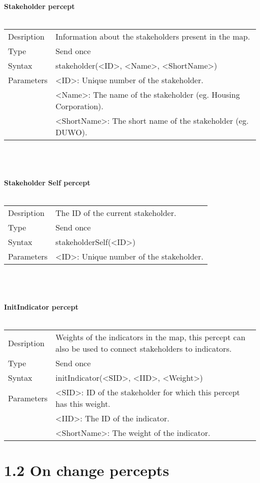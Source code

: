 \documentclass[english,11pt]{report}
\begin{document}
\textbf{Stakeholder percept}\\
\\
\begin{tabularx}{\textwidth}{lX}
 Desription & Information about the stakeholders present in the map. \\
 Type & Send once \\
 Syntax & stakeholder(<ID>, <Name>, <ShortName>) \\
 Parameters &   <ID>: Unique number of the stakeholder.\\
            &   <Name>: The name of the stakeholder (eg. Housing Corporation).\\
            &   <ShortName>: The short name of the stakeholder (eg. DUWO).
\end{tabularx}\\
\\
\\
\textbf{Stakeholder Self percept}\\
\\
\begin{tabularx}{\textwidth}{lX}
 Desription & The ID of the current stakeholder. \\
 Type & Send once \\
 Syntax & stakeholderSelf(<ID>) \\
 Parameters &   <ID>: Unique number of the stakeholder.
\end{tabularx}\\
\\
\\
\textbf{InitIndicator percept}\\
\\
\begin{tabularx}{\textwidth}{lX}
 Desription & Weights of the indicators in the map, this percept can also be used to connect stakeholders to indicators. \\
 Type & Send once \\
 Syntax & initIndicator(<SID>, <IID>, <Weight>) \\
 Parameters &   <SID>: ID of the stakeholder for which this percept has this weight.\\
            &   <IID>: The ID of the indicator.\\
            &   <ShortName>: The weight of the indicator.
\end{tabularx}

\newpage
\section*{1.2 On change percepts}
\end{document}
